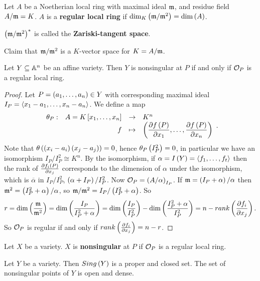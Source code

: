 \begin{definition}
Let $ A $ be a Noetherian local ring with maximal ideal $ \mathfrak{m} $, and residue field $ A / \mathfrak{m} = K $. $ A $ is a \textbf{regular local ring} if $ \dim_K\left( \mathfrak{m} / \mathfrak{m}^2 \right) = \dim\left( A \right) $.
\end{definition}

\begin{note*}
$ \left( \mathfrak{m} / \mathfrak{m}^2 \right)^* $ is called the \textbf{Zariski-tangent space}.
\end{note*}

Claim that $ \mathfrak{m} / \mathfrak{m}^2 $ is a $ K $-vector space for $ K = A / \mathfrak{m} $.

\begin{theorem}
Let $ Y \subseteq \mathbb{A}^n $ be an affine variety. Then $ Y $ is nonsingular at $ P $ if and only if $ \mathcal{O}_P $ is a regular local ring.
\end{theorem}

\begin{proof}
Let $ P = \left( a_1, \dots, a_n \right) \in Y $ with corresponding maximal ideal $ I_P = \left\langle x_1 - a_1, \dots, x_n - a_n \right\rangle $. We define a map
$$ \function[\theta_P]{A = K\sb{x_1, \dots, x_n}}{K^n}{f}{\rb{\dfrac{\partial f\rb{P}}{\partial x_1}, \dots, \dfrac{\partial f\rb{P}}{\partial x_n}}}. $$
Note that $ \theta\left( \left( x_i - a_i \right)\left( x_j - a_j \right) \right) = 0 $, hence $ \theta_P\left( I_P^2 \right) = 0 $, in particular we have an isomorphism $ I_P / I_P^2 \cong K^n $. By the isomorphism, if $ \alpha = I\left( Y \right) = \left\langle f_1, \dots, f_t \right\rangle $ then the rank of $ \tfrac{\partial f_i\left( P \right)}{\partial x_j} $ corresponds to the dimension of $ \alpha $ under the isomorphism, which is $ \overline{\alpha} $ in $ I_P / I_P^2 $, $ \left( \alpha + I_P \right) / I_P^2 $. Now $ \mathcal{O}_P = \left( A / \alpha \right)_{I_P} $. If $ \mathfrak{m} = \left( I_P + \alpha \right) / \alpha $ then $ \mathfrak{m}^2 = \left( I_P^2 + \alpha \right) / \alpha $, so $ \mathfrak{m} / \mathfrak{m}^2 = I_P / \left( I_P^2 + \alpha \right) $. So
$$ r = \dim\left( \dfrac{\mathfrak{m}}{\mathfrak{m}^2} \right) = \dim\left( \dfrac{I_P}{I_P^2 + \alpha} \right) = \dim\left( \dfrac{I_P}{I_P^2} \right) - \dim\left( \dfrac{I_P^2 + \alpha}{I_P^2} \right) = n - rank\left( \dfrac{\partial f_i}{\partial x_j} \right). $$
So $ \mathcal{O}_P $ is regular if and only if $ rank\left( \tfrac{\partial f_i}{\partial x_j} \right) = n - r $.
\end{proof}

\begin{definition}
Let $ X $ be a variety. $ X $ is \textbf{nonsingular} at $ P $ if $ \mathcal{O}_P $ is a regular local ring.
\end{definition}

\begin{theorem}
Let $ Y $ be a variety. Then $ Sing\left( Y \right) $ is a proper and closed set. The set of nonsingular points of $ Y $ is open and dense.
\end{theorem}

